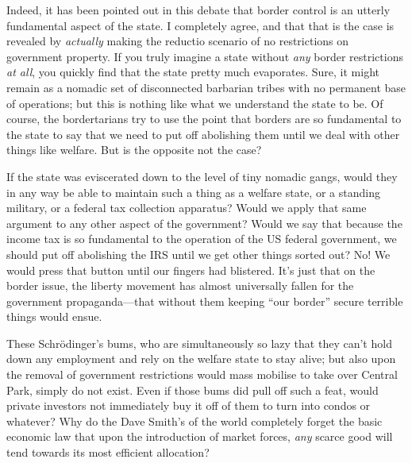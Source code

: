 \documentclass[11pt]{article}
\begin{document}
Indeed, it has been pointed out in this debate that border control is an utterly fundamental aspect of the state. I completely agree, and that that is the case is revealed by \emph{actually} making the reductio scenario of no restrictions on government property. If you truly imagine a state without \emph{any} border restrictions \emph{at all}, you quickly find that the state pretty much evaporates. Sure, it might remain as a nomadic set of disconnected barbarian tribes with no permanent base of operations; but this is nothing like what we understand the state to be. Of course, the bordertarians try to use the point that borders are so fundamental to the state to say that we need to put off abolishing them until we deal with other things like welfare. But is the opposite not the case?

If the state was eviscerated down to the level of tiny nomadic gangs, would they in any way be able to maintain such a thing as a welfare state, or a standing military, or a federal tax collection apparatus? Would we apply that same argument to any other aspect of the government? Would we say that because the income tax is so fundamental to the operation of the US federal government, we should put off abolishing the IRS until we get other things sorted out? No! We would press that button until our fingers had blistered. It's just that on the border issue, the liberty movement has almost universally fallen for the government propaganda---that without them keeping ``our border'' secure terrible things would ensue.

These Schrödinger's bums, who are simultaneously so lazy that they can't hold down any employment and rely on the welfare state to stay alive; but also upon the removal of government restrictions would mass mobilise to take over  Central Park, simply do not exist. Even if those bums did pull off such a feat, would private investors not immediately buy it off of them to turn into condos or whatever? Why do the Dave Smith's of the world completely forget the basic economic law that upon the introduction of market forces, \emph{any} scarce good will tend towards its most efficient allocation?
\end{document}
